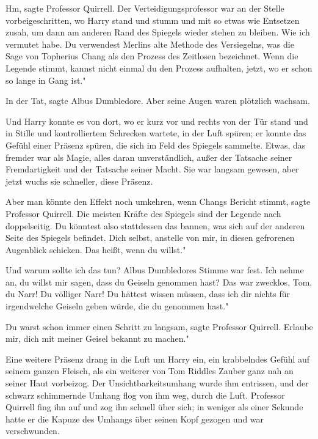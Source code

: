 \glqq Hm\grqq{}, sagte Professor Quirrell. Der Verteidigungsprofessor war an der
Stelle vorbeigeschritten, wo Harry stand und stumm und mit so etwas wie
Entsetzen zusah, um dann am anderen Rand des Spiegels wieder stehen zu bleiben.
\glqq Wie ich vermutet habe. Du verwendest Merlins alte Methode des Versiegelns,
was die Sage von Topherius Chang als den Prozess des Zeitlosen bezeichnet. Wenn
die Legende stimmt, kannst nicht einmal du den Prozess aufhalten, jetzt, wo er
schon so lange in Gang ist."

\glqq In der Tat\grqq{}, sagte Albus Dumbledore. Aber seine Augen waren
plötzlich wachsam.

Und Harry konnte es von dort, wo er kurz vor und rechts von der Tür stand und in
Stille und kontrolliertem Schrecken wartete, in der Luft spüren; er konnte das
Gefühl einer Präsenz spüren, die sich im Feld des Spiegels sammelte. Etwas, das
fremder war als Magie, alles daran unverständlich, außer der Tatsache seiner
Fremdartigkeit und der Tatsache seiner Macht. Sie war langsam gewesen, aber
jetzt wuchs sie schneller, diese Präsenz.

\glqq Aber man könnte den Effekt noch umkehren, wenn Changs Bericht
stimmt\grqq{}, sagte Professor Quirrell. \glqq Die meisten Kräfte des Spiegels
sind der Legende nach doppelseitig. Du könntest also stattdessen das bannen, was
sich auf der anderen Seite des Spiegels befindet. Dich selbst, anstelle von mir,
in diesen gefrorenen Augenblick schicken. Das heißt, wenn du willst."

\glqq Und warum sollte ich das tun?\grqq{} Albus Dumbledores Stimme war fest.
\glqq Ich nehme an, du willst mir sagen, dass du Geiseln genommen hast? Das war
zwecklos, Tom, du Narr! Du völliger Narr! Du hättest wissen müssen, dass ich dir
nichts für irgendwelche Geiseln geben würde, die du genommen hast."

\glqq Du warst schon immer einen Schritt zu langsam\grqq{}, sagte Professor
Quirrell. \glqq Erlaube mir, dich mit meiner Geisel bekannt zu machen."

Eine weitere Präsenz drang in die Luft um Harry ein, ein krabbelndes Gefühl auf
seinem ganzen Fleisch, als ein weiterer von Tom Riddles Zauber ganz nah an
seiner Haut vorbeizog. Der Unsichtbarkeitsumhang wurde ihm entrissen, und der
schwarz schimmernde Umhang flog von ihm weg, durch die Luft. Professor Quirrell
fing ihn auf und zog ihn schnell über sich; in weniger als einer Sekunde hatte
er die Kapuze des Umhangs über seinen Kopf gezogen und war verschwunden.

